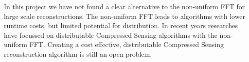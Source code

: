 In this project we have not found a clear alternative to the non-uniform FFT for large scale reconstructions. The non-uniform FFT leads to algorithms with lower runtime costs, but limited potential for distribution. In recent years researches have focussed on distributable Compressed Sensing algorithms\cite{dabbech2018cygnus, pratley2018fast} with the non-uniform FFT. Creating a cost effective, distributable Compressed Sensing reconstruction algorithm is still an open problem. 







